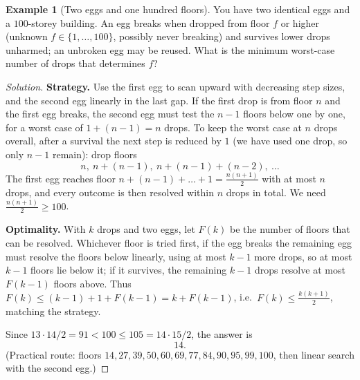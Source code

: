 \documentclass[11pt]{article}
\theoremstyle{definition}
\newtheorem{example}{Example}[section]
\begin{document}
\begin{example}[Two eggs and one hundred floors]
You have two identical eggs and a $100$-storey building. An egg breaks when dropped from floor $f$ or higher (unknown $f\in\{1,\dots,100\}$, possibly never breaking) and survives lower drops unharmed; an unbroken egg may be reused. What is the minimum worst-case number of drops that determines $f$?
\end{example}

\begin{proof}[Solution]
\textbf{Strategy.} Use the first egg to scan upward with decreasing step sizes, and the second egg linearly in the last gap. If the first drop is from floor $n$ and the first egg breaks, the second egg must test the $n-1$ floors below one by one, for a worst case of $1+(n-1)=n$ drops. To keep the worst case at $n$ drops overall, after a survival the next step is reduced by $1$ (we have used one drop, so only $n-1$ remain): drop floors
\[
n,\ n+(n-1),\ n+(n-1)+(n-2),\ \dots
\]
The first egg reaches floor $n+(n-1)+\dots+1=\tfrac{n(n+1)}2$ with at most $n$ drops, and every outcome is then resolved within $n$ drops in total. We need $\tfrac{n(n+1)}2\ge100$.

\textbf{Optimality.} With $k$ drops and two eggs, let $F(k)$ be the number of floors that can be resolved. Whichever floor is tried first, if the egg breaks the remaining egg must resolve the floors below linearly, using at most $k-1$ more drops, so at most $k-1$ floors lie below it; if it survives, the remaining $k-1$ drops resolve at most $F(k-1)$ floors above. Thus $F(k)\le(k-1)+1+F(k-1)=k+F(k-1)$, i.e.\ $F(k)\le\tfrac{k(k+1)}2$, matching the strategy.

Since $13\cdot14/2=91<100\le105=14\cdot15/2$, the answer is
\[
\boxed{14}.
\]
(Practical route: floors $14,27,39,50,60,69,77,84,90,95,99,100$, then linear search with the second egg.)
\end{proof}
\end{document}
